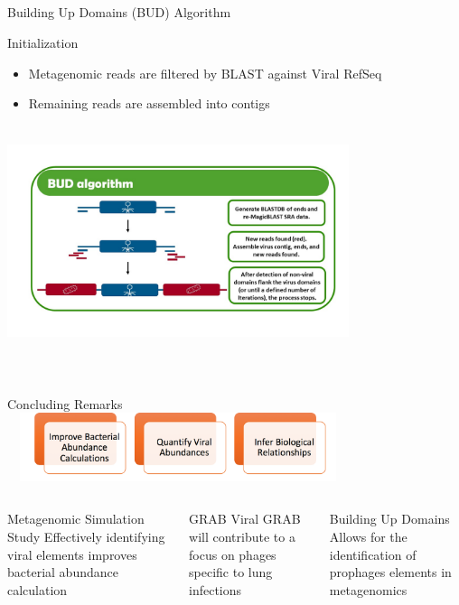 \documentclass[11pt]{beamer}
\begin{document}
\subsection{}
	\begin{frame}{Building Up Domains (BUD) Algorithm}
	\begin{block}{Initialization}
	\begin{itemize}
	\item Metagenomic reads are filtered by BLAST against Viral RefSeq
	\item Remaining reads are assembled into contigs
	\end{itemize}
	\end{block}
	\vspace{-0.5cm}
	\center
	\includegraphics[height=6.75cm, width=10cm]{BUD_Algorithm.jpg}
	
	\end{frame}
	


\section{}

	\begin{frame}{Concluding Remarks}
	\center
	\includegraphics[height=2cm, width=10cm]{goals.png}
	\begin{columns}
	\begin{block}{Metagenomic Simulation Study}
	Effectively identifying viral elements improves bacterial abundance calculation
	\end{block}
	\begin{block}{GRAB}
	Viral GRAB will contribute to a focus on phages specific to lung infections
	\end{block}
	\begin{block}{Building Up Domains}
	Allows for the identification of prophages elements in metagenomics
	\end{block}
	
	\end{columns}
	
	\end{frame}
	
\end{document}

